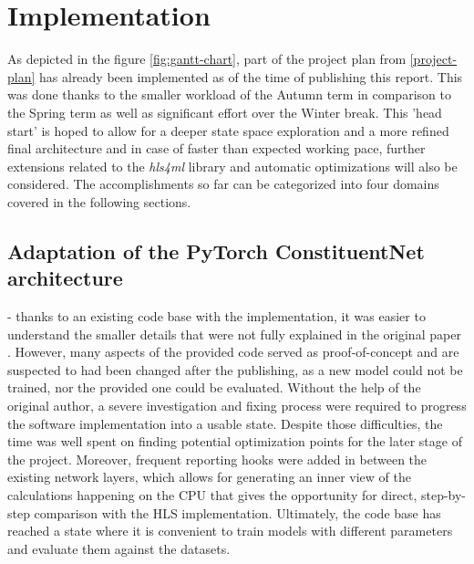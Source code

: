 \chapter{Implementation}\label{implementation}
As depicted in the figure \ref{fig:gantt-chart}, part of the project plan from \autoref{project-plan} has already been implemented as of the time of publishing this report. This was done thanks to the smaller workload of the Autumn term in comparison to the Spring term as well as significant effort over the Winter break. This 'head start' is hoped to allow for a deeper state space exploration and a more refined final architecture and in case of faster than expected working pace, further extensions related to the \textit{hls4ml} library and automatic optimizations will also be considered. The accomplishments so far can be categorized into four domains covered in the following sections.

\section{Adaptation of the PyTorch ConstituentNet architecture} - thanks to an existing code base with the implementation, it was easier to understand the smaller details that were not fully explained in the original paper \cite{3-yuan2021constituentnet:}. However, many aspects of the provided code served as proof-of-concept and are suspected to had been changed after the publishing, as a new model could not be trained, nor the provided one could be evaluated. Without the help of the original author, a severe investigation and fixing process were required to progress the software implementation into a usable state. Despite those difficulties, the time was well spent on finding potential optimization points for the later stage of the project. Moreover, frequent reporting hooks were added in between the existing network layers, which allows for generating an inner view of the calculations happening on the CPU that gives the opportunity for direct, step-by-step comparison with the HLS implementation. Ultimately, the code base has reached a state where it is convenient to train models with different parameters and evaluate them against the datasets.
  
